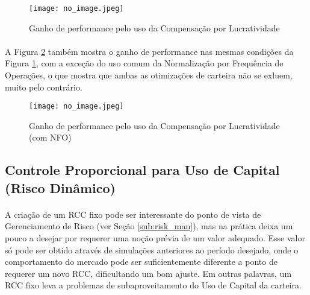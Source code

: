 \begin{figure}[h]
    \texttt{[image: no\_image.jpeg]}
    \centering
    \caption{Ganho de performance pelo uso da Compensação por Lucratividade}
    \label{fig:141}
\end{figure}

\paragraph{} A Figura \ref{fig:142} também mostra o ganho de performance nas mesmas condições da Figura \ref{fig:141}, com a exceção do uso comum da Normalização por Frequência de Operações, o que mostra que ambas as otimizações de carteira não se exluem, muito pelo contrário.

\begin{figure}[h]
    \texttt{[image: no\_image.jpeg]}
    \centering
    \caption{Ganho de performance pelo uso da Compensação por Lucratividade (com NFO)}
    \label{fig:142}
\end{figure}



\subsection{Controle Proporcional para Uso de Capital (Risco Dinâmico)}
\label{sub:dynamic_rcc}


\paragraph{} A criação de um RCC fixo pode ser interessante do ponto de vista de Gerenciamento de Risco (ver Seção \ref{sub:risk_man}), mas na prática deixa um pouco a desejar por requerer uma noção prévia de um valor adequado. Esse valor só pode ser obtido através de simulações anteriores ao período desejado, onde o comportamento do mercado pode ser suficientemente diferente a ponto de requerer um novo RCC, dificultando um bom ajuste. Em outras palavras, um RCC fixo leva a problemas de subaproveitamento do Uso de Capital da carteira.

